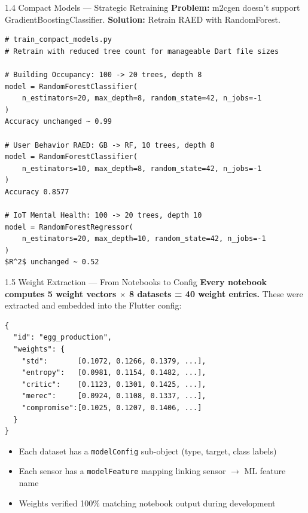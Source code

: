 \documentclass[aspectratio=169]{beamer}
\begin{document}
\begin{frame}{1.4 Compact Models --- Strategic Retraining}
  \textbf{Problem:} m2cgen doesn't support GradientBoostingClassifier.
  \textbf{Solution:} Retrain RAED with RandomForest.

  \vspace{0.2cm}
  \begin{lstlisting}[style=pythonstyle]
# train_compact_models.py
# Retrain with reduced tree count for manageable Dart file sizes

# Building Occupancy: 100 -> 20 trees, depth 8
model = RandomForestClassifier(
    n_estimators=20, max_depth=8, random_state=42, n_jobs=-1
)
Accuracy unchanged ~ 0.99

# User Behavior RAED: GB -> RF, 10 trees, depth 8
model = RandomForestClassifier(
    n_estimators=10, max_depth=8, random_state=42, n_jobs=-1
)
Accuracy 0.8577

# IoT Mental Health: 100 -> 20 trees, depth 10
model = RandomForestRegressor(
    n_estimators=20, max_depth=10, random_state=42, n_jobs=-1
)
$R^2$ unchanged ~ 0.52
  \end{lstlisting}
\end{frame}

\begin{frame}{1.5 Weight Extraction --- From Notebooks to Config}
  \textbf{Every notebook computes 5 weight vectors $\times$ 8 datasets = 40 weight entries.}
  These were extracted and embedded into the Flutter config:

  \vspace{0.2cm}
  \begin{lstlisting}[style=jsonstyle]
{
  "id": "egg_production",
  "weights": {
    "std":       [0.1072, 0.1266, 0.1379, ...],
    "entropy":   [0.0981, 0.1154, 0.1482, ...],
    "critic":    [0.1123, 0.1301, 0.1425, ...],
    "merec":     [0.0924, 0.1108, 0.1337, ...],
    "compromise":[0.1025, 0.1207, 0.1406, ...]
  }
}
  \end{lstlisting}

  \begin{itemize}
    \item Each dataset has a \texttt{modelConfig} sub-object (type, target, class labels)
    \item Each sensor has a \texttt{modelFeature} mapping linking sensor $\rightarrow$ ML feature name
    \item Weights verified 100\% matching notebook output during development
  \end{itemize}
\end{frame}
\end{document}
